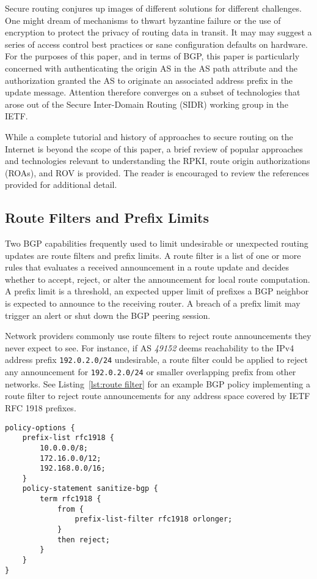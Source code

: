 \documentclass[sigconf]{acmart}
\begin{document}
Secure routing conjures up images of different solutions for different
challenges.  One might dream of mechanisms to thwart byzantine failure
or the use of encryption to protect the privacy of routing data in
transit.  It may may suggest a series of access control best practices
or sane configuration defaults on hardware.  For the purposes of this
paper, and in terms of BGP, this paper is particularly concerned with
authenticating the origin AS in the AS path attribute and the
authorization granted the AS to originate an associated address prefix
in the update message.  Attention therefore converges on a subset of
technologies that arose out of the Secure Inter-Domain Routing (SIDR)
working group in the IETF.

While a complete tutorial and history of approaches to secure routing on
the Internet is beyond the scope of this paper, a brief review of
popular approaches and technologies relevant to understanding the RPKI,
route origin authorizations (ROAs), and ROV is provided.  The reader is
encouraged to review the references provided for additional detail.

\subsection{Route Filters and Prefix Limits}

Two BGP capabilities frequently used to limit undesirable or unexpected
routing updates are route filters and prefix limits.  A route filter is
a list of one or more rules that evaluates a received announcement in a
route update and decides whether to accept, reject, or alter the
announcement for local route computation.  A prefix limit is a
threshold, an expected upper limit of prefixes a BGP neighbor is
expected to announce to the receiving router.  A breach of a prefix
limit may trigger an alert or shut down the BGP peering session.

Network providers commonly use route filters to reject route
announcements they never expect to see.  For instance, if AS
\emph{49152} deems reachability to the IPv4 address prefix
\texttt{192.0.2.0/24} undesirable, a route filter could be applied to
reject any announcement for \texttt{192.0.2.0/24} or smaller overlapping
prefix from other networks.  See Listing~\ref{lst:route filter} for an
example BGP policy implementing a route filter to reject route
announcements for any address space covered by IETF RFC 1918
prefixes.\cite{moskowitz_address_1996}

\begin{lstlisting}[float,basicstyle=\footnotesize\ttfamily,caption={Example Junos route filter},label={lst:route filter}]
policy-options {
    prefix-list rfc1918 {
        10.0.0.0/8;                         
        172.16.0.0/12;                      
        192.168.0.0/16;                     
    }
    policy-statement sanitize-bgp {
        term rfc1918 {
            from {
                prefix-list-filter rfc1918 orlonger;
            }
            then reject;
        }
    }
}
\end{lstlisting}
\end{document}
